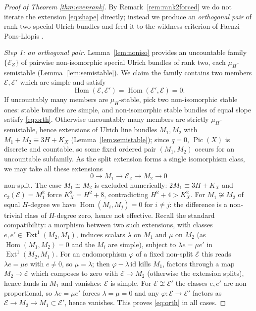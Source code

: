 \documentclass{amsart}
\theoremstyle{definition}
\newcommand{\EE}{\mathcal{E}}
\newcommand{\Pic}{\operatorname{Pic}}
\newcommand{\Ext}{\operatorname{Ext}}
\newcommand{\Hom}{\operatorname{Hom}}
\begin{document}
\begin{proof}[Proof of Theorem \textup{\ref{thm:evenrank}}]
By Remark~\ref{rem:rank2forced} we do not iterate the extension \eqref{eq:shape} directly; instead we produce an \emph{orthogonal pair} of rank two special Ulrich bundles and feed it to the wildness criterion of Faenzi--Pons-Llopis \cite{FPL}.

\smallskip
\noindent \emph{Step 1: an orthogonal pair.} Lemma~\ref{lem:noniso} provides an uncountable family $\{\EE_Z\}$ of pairwise non-isomorphic special Ulrich bundles of rank two, each $\mu_H$-semistable (Lemma~\ref{lem:semistable}). We claim the family contains two members $\EE,\EE'$ which are simple and satisfy
\begin{equation}\label{eq:orth}
\Hom(\EE,\EE')=\Hom(\EE',\EE)=0 .
\end{equation}
If uncountably many members are $\mu_H$-stable, pick two non-isomorphic stable ones: stable bundles are simple, and non-isomorphic stable bundles of equal slope satisfy \eqref{eq:orth}. Otherwise uncountably many members are strictly $\mu_H$-semistable, hence extensions of Ulrich line bundles $M_1,M_2$ with $M_1+M_2\equiv3H+K_X$ (Lemma~\ref{lem:semistable}); since $q=0$, $\Pic(X)$ is discrete and countable, so some fixed ordered pair $(M_1,M_2)$ occurs for an uncountable subfamily. As the split extension forms a single isomorphism class, we may take all these extensions
\[
0\to M_1\to\EE_Z\to M_2\to0
\]
non-split. The case $M_1\cong M_2$ is excluded numerically: $2M_1\equiv3H+K_X$ and $c_2(\EE)=M_1^2$ force $K_X^2=H^2+8$, contradicting $H^2+4>K_X^2$. For $M_1\not\cong M_2$ of equal $H$-degree we have $\Hom(M_i,M_j)=0$ for $i\neq j$: the difference is a non-trivial class of $H$-degree zero, hence not effective. Recall the standard compatibility: a morphism between two such extensions, with classes $e,e'\in\Ext^1(M_2,M_1)$, induces scalars $\lambda$ on $M_1$ and $\mu$ on $M_2$ (as $\Hom(M_1,M_2)=0$ and the $M_i$ are simple), subject to $\lambda e=\mu e'$ in $\Ext^1(M_2,M_1)$. For an endomorphism $\varphi$ of a fixed non-split $\EE$ this reads $\lambda e=\mu e$ with $e\neq0$, so $\mu=\lambda$; then $\varphi-\lambda\,\mathrm{id}$ kills $M_1$, factors through a map $M_2\to\EE$ which composes to zero with $\EE\to M_2$ (otherwise the extension splits), hence lands in $M_1$ and vanishes: $\EE$ is simple. For $\EE\not\cong\EE'$ the classes $e,e'$ are non-proportional, so $\lambda e=\mu e'$ forces $\lambda=\mu=0$ and any $\varphi:\EE\to\EE'$ factors as $\EE\to M_2\to M_1\subset\EE'$, hence vanishes. This proves \eqref{eq:orth} in all cases.


\end{proof}
\end{document}

